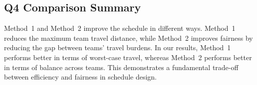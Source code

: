 \documentclass[11pt, letterpaper]{article}
\begin{document}
\subsection{Q4 Comparison Summary}

Method~1 and Method~2 improve the schedule in different ways. Method~1 reduces
the maximum team travel distance, while Method~2 improves fairness by reducing
the gap between teams' travel burdens. In our results, Method~1 performs better
in terms of worst-case travel, whereas Method~2 performs better in terms of
balance across teams. This demonstrates a fundamental trade-off between
efficiency and fairness in schedule design.
\end{document}
